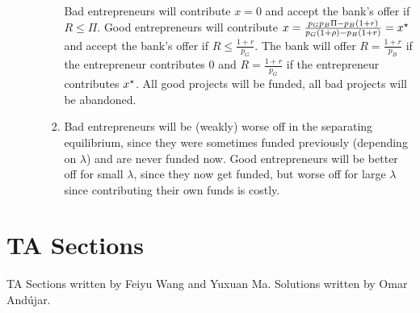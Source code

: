\documentclass[12pt]{article}
\begin{document}
\begin{enumerate}
\begin{enumerate}
\begin{enumerate}
			Bad entrepreneurs will contribute $x = 0$ and accept the bank's offer if $R \le \Pi$. Good entrepreneurs will contribute $x = \frac{p_Gp_B\Pi - p_B(1+r)}{p_G(1+\rho) - p_B(1+r)} = x^\star$ and accept the bank's offer if $R \le \frac{1+r}{p_G}$. The bank will offer $R = \frac{1+r}{p_B}$ if the entrepreneur contributes 0 and $R = \frac{1+r}{p_G}$ if the entrepreneur contributes $x^\star$. All good projects will be funded, all bad projects will be abandoned.
			\item Bad entrepreneurs will be (weakly) worse off in the separating equilibrium, since they were sometimes funded previously (depending on $\lambda$) and are never funded now. Good entrepreneurs will be better off for small $\lambda$, since they now get funded, but worse off for large $\lambda$ since contributing their own funds is costly.
		\end{enumerate}
	\end{enumerate}
\end{enumerate}





\section{TA Sections}

TA Sections written by Feiyu Wang and Yuxuan Ma. Solutions written by Omar And\'{u}jar.


















\end{document}
